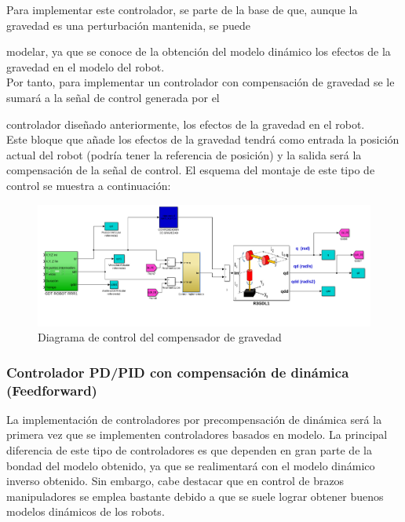 Para implementar este controlador, se parte de la base de que, aunque la gravedad es una perturbación mantenida, se puede

modelar, ya que se conoce de la obtención del modelo dinámico los efectos de la gravedad en el modelo del robot.\\

Por tanto, para implementar un controlador con compensación de gravedad se le sumará a la señal de control generada por el

controlador diseñado anteriormente, los efectos de la gravedad en el robot.\\

Este bloque que añade los efectos de la gravedad tendrá como entrada la posición actual del robot (podría tener la referencia de posición) y la salida será la compensación de la señal de control. El esquema del montaje de este tipo de control se muestra a continuación:



\begin{figure}[h!]
	
	\centering
	
	\includegraphics[width=.8\textwidth]{montaje_grav}
	
	\caption{Diagrama de control del compensador de gravedad}
	
\end{figure}



\subsubsection{Controlador PD/PID con compensación de dinámica (Feedforward)}

La implementación de controladores por precompensación de dinámica será la primera vez que se implementen controladores basados en modelo. La principal diferencia de este tipo de controladores es que dependen en gran parte de la bondad del modelo obtenido, ya que se realimentará con el modelo dinámico inverso obtenido. Sin embargo, cabe destacar que en control de brazos manipuladores se emplea bastante debido a que se suele lograr obtener buenos modelos dinámicos de los robots.\\



